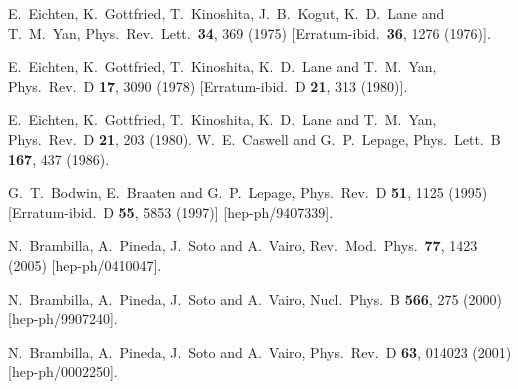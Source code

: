 \documentclass[10pt, a4paper, twocolumn]{article}
\begin{document}
{\begin{thebibliography}{99}
  E.~Eichten, K.~Gottfried, T.~Kinoshita, J.~B.~Kogut, K.~D.~Lane and T.~M.~Yan,
  Phys.\ Rev.\ Lett.\  {\bf 34}, 369 (1975)
  [Erratum-ibid.\  {\bf 36}, 1276 (1976)].

  E.~Eichten, K.~Gottfried, T.~Kinoshita, K.~D.~Lane and T.~M.~Yan,
  Phys.\ Rev.\ D {\bf 17}, 3090 (1978)
  [Erratum-ibid.\ D {\bf 21}, 313 (1980)].


  E.~Eichten, K.~Gottfried, T.~Kinoshita, K.~D.~Lane and T.~M.~Yan,
  Phys.\ Rev.\ D {\bf 21}, 203 (1980).
  W.~E.~Caswell and G.~P.~Lepage,
  Phys.\ Lett.\ B {\bf 167}, 437 (1986).

  G.~T.~Bodwin, E.~Braaten and G.~P.~Lepage,
  Phys.\ Rev.\ D {\bf 51}, 1125 (1995)
  [Erratum-ibid.\ D {\bf 55}, 5853 (1997)]
  [hep-ph/9407339].

  N.~Brambilla, A.~Pineda, J.~Soto and A.~Vairo,
  Rev.\ Mod.\ Phys.\  {\bf 77}, 1423 (2005)
  [hep-ph/0410047].

  N.~Brambilla, A.~Pineda, J.~Soto and A.~Vairo,
  Nucl.\ Phys.\ B {\bf 566}, 275 (2000)
  [hep-ph/9907240].

  N.~Brambilla, A.~Pineda, J.~Soto and A.~Vairo,
  Phys.\ Rev.\ D {\bf 63}, 014023 (2001)
  [hep-ph/0002250].



\end{thebibliography}}
\end{document}
